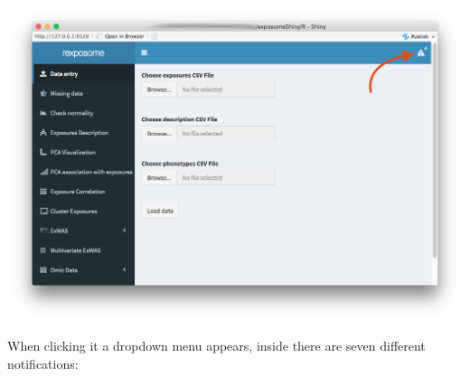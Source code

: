 \documentclass[
]{book}
\begin{document}
\includegraphics{images/general1.png}

When clicking it a dropdown menu appears, inside there are seven different notifications:
\end{document}
